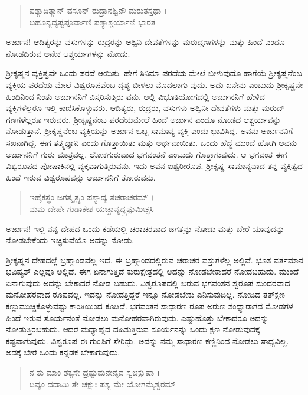 \begin{verse}
ಪಶ್ಯಾದಿತ್ಯಾನ್ ವಸೂನ್ ರುದ್ರಾನಶ್ವಿನೌ ಮರುತಸ್ತಥಾ ।\\ಬಹೂನ್ಯದೃಷ್ಟಪೂರ್ವಾಣಿ ಪಶ್ಯಾಶ್ಚರ್ಯಾಣಿ ಭಾರತ 
\end{verse}

{\small ಅರ್ಜುನ! ಆದಿತ್ಯರನ್ನು ವಸುಗಳನ್ನು ರುದ್ರರನ್ನು ಅಶ್ವಿನಿ ದೇವತೆಗಳನ್ನು ಮರುದ್ಗಣಗಳನ್ನು ಮತ್ತು ಹಿಂದೆ ಎಂದೂ ನೋಡದಿರುವ ಅನೇಕ ಆಶ್ಚರ್ಯಗಳನ್ನು ನೋಡು.}

ಶ್ರೀಕೃಷ್ಣನ ವ್ಯಕ್ತಿತ್ವವೇ ಒಂದು ಪರದೆ ಆಯಿತು. ಹೇಗೆ ಸಿನಿಮಾ ಪರದೆಯ ಮೇಲೆ ಬೀಳುವುದೊ ಹಾಗೆಯೆ ಶ್ರೀಕೃಷ್ಣನೆಂಬ ವ್ಯಕ್ತಿಯ ಪರದೆಯ ಮೇಲೆ ವಿಶ್ವರೂಪವೆಂಬ ದೃಶ್ಯ ಬೀಳಲು ಮೊದಲಾಗು ವುದು. ಅದು ಏನೇನು ಎಂಬುದು ಶ್ರೀಕೃಷ್ಣನೇ ಹಿಂದಿನಿಂದ ನಿಂತು ಅರ್ಜುನನಿಗೆ ವಿಸ್ತರಿಸುತ್ತಿರು ವನು. ಅಲ್ಲಿ ವಿಭೂತಿಯೋಗದಲ್ಲಿ ಅರ್ಜುನನಿಗೆ ಹೇಳಿದ ವ್ಯಕ್ತಿಗಳೆಲ್ಲರೂ ಇಲ್ಲಿ ಕಾಣಿಸಿಕೊಳ್ಳುವರು. ಆದಿತ್ಯರು, ರುದ್ರರು, ವಸುಗಳು ಅಶ್ವಿನೀ ದೇವತೆಗಳು ಮತ್ತು ಮರುದ್​ಗಣಗಳೆಲ್ಲರೂ ಇರುವರು. ಶ್ರೀಕೃಷ್ಣನೆಂಬ ಪರದೆಯಮೇಲೆ ಹಿಂದೆ ಅರ್ಜುನ ಎಂದೂ ನೋಡದ ಆಶ್ಚರ್ಯವನ್ನು ನೋಡುತ್ತಾನೆ. ಶ್ರೀಕೃಷ್ಣನೆಂಬ ವ್ಯಕ್ತಿಯನ್ನು ಅರ್ಜುನ ಒಬ್ಬ ಸಾಮಾನ್ಯ ವ್ಯಕ್ತಿ ಎಂದು ಭಾವಿಸಿದ್ದ. ಅವನು ಅರ್ಜುನನಿಗೆ ಸಖನಾಗಿದ್ದ. ಈಗ ತತ್ತ್ವಜ್ಞಾನಿ ಎಂದು ಗೊತ್ತಾಯಿತು ಮತ್ತು ಅರ್ಥವಾಯಿತು. ಒಂದು ಹೆಜ್ಜೆ ಮುಂದೆ ಹೋಗಿ ಅವನು ಅರ್ಜುನನಿಗೆ ಗುರು ಮಾತ್ರವಲ್ಲ, ಲೋಕಗುರುವಾದ ಭಗವಂತನೆ ಎಂಬುದು ಗೊತ್ತಾಗುವುದು. ಆ ಭಗವಂತ ಈಗ ವಿಶ್ವರೂಪದ ಪೋಷಾಕಿನಲ್ಲಿ ವ್ಯಕ್ತವಾಗುತ್ತಿರುವನು. ಇದು ಅವನ ಐಶ್ವರೀರೂಪ. ಶ್ರೀಕೃಷ್ಣ ಸಾಮಾನ್ಯವಾದ ತನ್ನ ವ್ಯಕ್ತಿತ್ವದ ಹಿಂದೆ ಇರುವ ವಿಶ್ವರೂಪವನ್ನು ಅರ್ಜುನನಿಗೆ ತೋರುವನು.

\begin{verse}
ಇಹೈಕಸ್ಥಂ ಜಗತ್ಕೃತ್ಸ್ನಂ ಪಶ್ಯಾದ್ಯ ಸಚರಾಚರಮ್ ।\\ಮಮ ದೇಹೇ ಗುಡಾಕೇಶ ಯಚ್ಚಾನ್ಯದ್ದ್ರಷ್ಟುಮಿಚ್ಛಸಿ 
\end{verse}

{\small ಅರ್ಜುನ! ಇಲ್ಲಿ ನನ್ನ ದೇಹದ ಒಂದು ಕಡೆಯಲ್ಲಿ ಚರಾಚರವಾದ ಜಗತ್ತನ್ನು ನೋಡು ಮತ್ತು ಬೇರೆ ಯಾವುದನ್ನು ನೋಡಬೇಕೆಂದು ಇಚ್ಛಿಸುವೆಯೊ ಅದನ್ನು ನೋಡು.}

ಶ್ರೀಕೃಷ್ಣನ ದೇಹದಲ್ಲೆ ಬ್ರಹ್ಮಾಂಡವೆಲ್ಲ ಇದೆ. ಈ ಬ್ರಹ್ಮಾಂಡದಲ್ಲಿರುವ ಚರಾಚರ ವಸ್ತುಗಳೆಲ್ಲ ಅಲ್ಲಿವೆ. ಭೂತ ವರ್ತಮಾನ ಭವಿಷ್ಯತ್ ಎಲ್ಲವೂ ಅಲ್ಲಿದೆ. ಈಗ ಏನಾಗುತ್ತಿದೆ ಕುರುಕ್ಷೇತ್ರದಲ್ಲಿ ಅದನ್ನು ನೋಡಬೇಕಾದರೆ ನೋಡಬಹುದು. ಮುಂದೆ ಏನಾಗುವುದು ಅದನ್ನು ಬೇಕಾದರೆ ನೋಡ ಬಹುದು. ವಿಶ್ವರೂಪದಲ್ಲಿ ಬರುವ ಭಗವಂತನ ಸ್ವರೂಪ ಸುಂದರವಾದ ಮನೋಹರವಾದ ರೂಪವಲ್ಲ. ಇದನ್ನು ನೋಡತ್ತಿದ್ದರೆ ಇನ್ನೂ ನೋಡಬೇಕು ಎನಿಸುವುದಿಲ್ಲ. ನೋಡಿದ ತತ್​ಕ್ಷಣ ಕಣ್ಣುಮುಚ್ಚಿಕೊಳ್ಳುವಷ್ಟು ಕಾಂತಿಯಿಂದ ಕೂಡಿದೆ. ಭಗವಂತನ ಸಾಧಾರಣ ರೂಪ ಅರುಣ ಸಂಧ್ಯಾರಾಗದ ಮೋಡಗಳ ಹಿಂದೆ ಇರುವ ಸೂರ್ಯನಂತೆ ನೋಡಲು ಮನೋಹರವಾಗಿರುವುದು. ಎಷ್ಟುಹೊತ್ತು ಬೇಕಾದರೂ ಅದನ್ನು ನೋಡುತ್ತಿರಬಹುದು. ಆದರೆ ಮಧ್ಯಾಹ್ನದ ದಹಿಸುತ್ತಿರುವ ಸೂರ್ಯನನ್ನು ಒಂದು ಕ್ಷಣ ನೋಡುವುದಕ್ಕೆ ಕಷ್ಟವಾಗುವುದು. ವಿಶ್ವರೂಪ ಈ ಗುಂಪಿಗೆ ಸೇರಿದ್ದು. ಅದನ್ನು ನಮ್ಮ ಸಾಧಾರಣ ಕಣ್ಣಿನಿಂದ ನೋಡಲು ಸಾಧ್ಯವಿಲ್ಲ. ಅದಕ್ಕೆ ಬೇರೆ ಒಂದು ಕನ್ನಡಕ ಬೇಕಾಗುವುದು.

\begin{verse}
ನ ತು ಮಾಂ ಶಕ್ಯಸೇ ದ್ರಷ್ಟುಮನೇನೈವ ಸ್ವಚಕ್ಷುಷಾ ।\\ದಿವ್ಯಂ ದದಾಮಿ ತೇ ಚಕ್ಷುಃ ಪಶ್ಯ ಮೇ ಯೋಗಮೈಶ್ವರಮ್ 
\end{verse}

